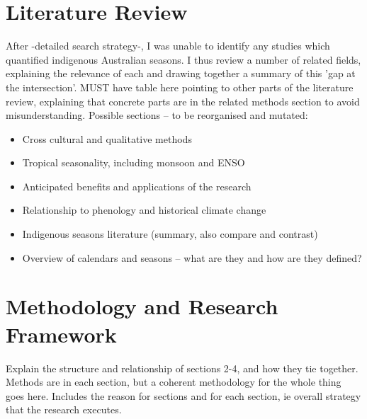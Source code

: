 \section{Literature Review}
After -detailed search strategy-, I was unable to identify any studies which quantified indigenous Australian seasons.
I thus review a number of related fields, explaining the relevance of each and drawing together a summary of this 'gap at the intersection'.
MUST have table here pointing to other parts of the literature review, explaining that concrete parts are in the related methods section to avoid misunderstanding. 
Possible sections – to be reorganised and mutated:

\begin{itemize}
\item Cross cultural and qualitative methods
\item Tropical seasonality, including monsoon and ENSO
\item Anticipated benefits and applications of the research
\item Relationship to phenology and historical climate change
\item Indigenous seasons literature (summary, also compare and contrast)
\item Overview of calendars and seasons – what are they and how are they defined?
\end{itemize}

\section{Methodology and Research Framework}
Explain the structure and relationship of sections 2-4, and how they tie together.
Methods are in each section, but a coherent methodology for the whole thing goes here.
Includes the reason for sections and for each section, ie overall strategy that the research executes.
